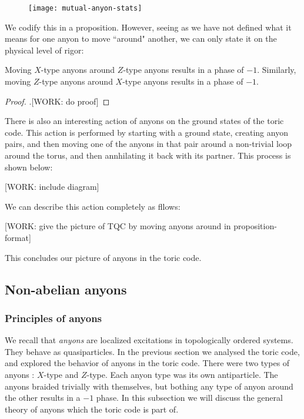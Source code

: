 \begin{figure}[h]
\begin{center}
\texttt{[image: mutual-anyon-stats]}
\end{center}
\end{figure}

We codify this in a proposition. However, seeing as we have not defined what it means for one anyon to move ``around" another, we can only state it on the physical level of rigor:

\begin{propositionph} Moving $X$-type anyons around $Z$-type anyons results in a phase of $-1$. Similarly, moving $Z$-type anyons around $X$-type anyons results in a phase of $-1$.
\end{propositionph}
\begin{proof}.[WORK: do proof]
\end{proof}

There is also an interesting action of anyons on the ground states of the toric code. This action is performed by starting with a ground state, creating anyon pairs, and then moving one of the anyons in that pair around a non-trivial loop around the torus, and then annhilating it back with its partner. This process is shown below:

[WORK: include diagram]

We can describe this action completely as fllows:

[WORK: give the picture of TQC by moving anyons around in proposition-format]

This concludes our picture of anyons in the toric code.

\subsection{Non-abelian anyons}

\subsubsection{Principles of anyons}

We recall that \textit{anyons} are localized excitations in topologically ordered systems. They behave as quasiparticles. In the previous section we analysed the toric code, and explored the behavior of anyons in the toric code. There were two types of anyons : $X$-type and $Z$-type. Each anyon type was its own antiparticle. The anyons braided trivially with themselves, but bothing any type of anyon around the other results in a $-1$ phase. In this subsection we will discuss the general theory of anyons which the toric code is part of.

